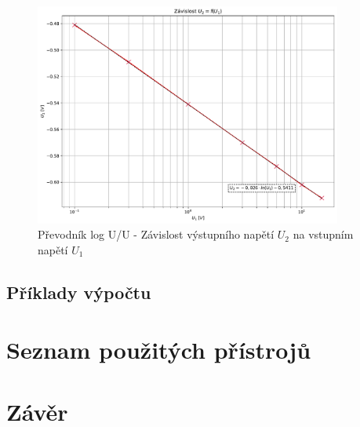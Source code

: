\documentclass[a4paper, czech]{article}
\begin{document}
\begin{figure}[H]
    \centering
    \includegraphics[width=0.9\textwidth]{grafy/graf_prevodnik_logUU.pdf}
    \caption{Převodník log U/U - Závislost výstupního napětí $U_2$ na vstupním napětí $U_1$}
\end{figure}

\subsection{Příklady výpočtu}

\section{Seznam použitých přístrojů}

\section{Závěr}
\end{document}

